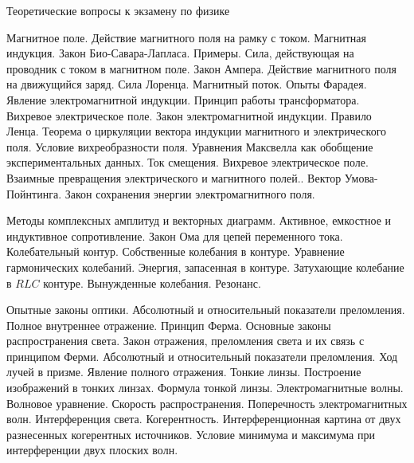 \documentclass[a4paper]{exam}
\begin{document}
\firstpageheadrule
\begin{center}
	Теоретические вопросы к экзамену по физике
\end{center}
\begin{questions}
\question Магнитное поле. Действие магнитного поля на рамку с током. Магнитная индукция. Закон Био-Савара-Лапласа. Примеры.
\question Сила, действующая на проводник с током в магнитном поле. Закон Ампера. Действие магнитного поля на движущийся заряд. Сила Лоренца.
\question Магнитный поток. Опыты Фарадея. Явление электромагнитной индукции. Принцип работы трансформатора. Вихревое электрическое поле. Закон электромагнитной индукции. Правило Ленца.
\question Теорема о циркуляции вектора индукции магнитного и электрического поля. Условие вихреобразности поля.
\question Уравнения Максвелла как обобщение экспериментальных данных. Ток смещения. Вихревое электрическое поле. Взаимные превращения электрического и магнитного полей..
\question Вектор Умова-Пойнтинга. Закон сохранения энергии электромагнитного поля.

 

\question  Методы комплексных амплитуд и векторных диаграмм. Активное, емкостное и индуктивное сопротивление. Закон Ома для цепей переменного тока.
\question Колебательный контур. Собственные колебания в контуре. Уравнение гармонических колебаний. Энергия, запасенная в контуре. 
\question Затухающие колебание в $RLC$ контуре. 
\question Вынужденные колебания. Резонанс.

 


\question Опытные законы оптики. Абсолютный и относительный показатели преломления. Полное внутреннее отражение. 
\question Принцип Ферма. Основные законы распространения света.
\question Закон отражения, преломления света и их связь с принципом Ферми. Абсолютный и относительный показатели преломления. Ход лучей в призме. Явление полного отражения.
\question Тонкие линзы. Построение изображений в тонких линзах. Формула тонкой линзы.
\question Электромагнитные волны. Волновое уравнение. Скорость распространения. Поперечность электромагнитных волн. 
\question Интерференция света. Когерентность. 
\question Интерференционная картина от двух разнесенных когерентных источников.
\question   Условие минимума и максимума при интерференции двух плоских волн.
 


\end{questions}
\end{document}
